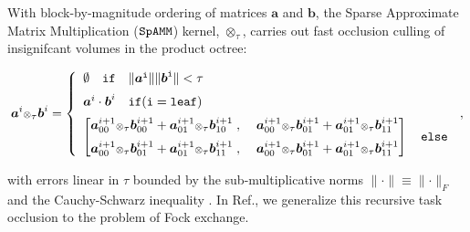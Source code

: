 \documentclass[letterpaper,twocolumn,amsmath,amsfont,amssymb,english,aps,jcp,preprintnumbers,groupaddress,nofootinbib,tightenlines]{revtex4}
\newcommand{\mat}[1]{\boldsymbol{#1}}
\newcommand{\ot}{ {\scriptstyle \otimes}_{ \tau } }
\begin{document}
With block-by-magnitude ordering of matrices $\mat{a}$ and $\mat{b}$, 
the Sparse Approximate Matrix Multiplication ($\tt SpAMM$) kernel,  $\ot$, carries out fast 
occlusion culling of insignifcant volumes in the product octree:
\begin{widetext}
\begin{equation}
\mat{a}^{i} \ot \mat{b}^{i} = 
\left\{
        \begin{array}{ll}
                 \emptyset \quad \tt{if}\quad \lVert \mat{a}^i \rVert \lVert \mat{b}^i \rVert < \tau \\[0.2cm]
                 \mat{a} ^i \cdot \mat{b}^i \quad  \tt{if}(i=\tt{leaf}) \\[0.2cm]
\begin{bmatrix} \mat{a}^{i+1}_{00} \ot \mat{b}^{i+1}_{00} +\mat{a}^{i+1}_{01} \ot \mat{b}^{i+1}_{10} \; , \; &
                \mat{a}^{i+1}_{00} \ot \mat{b}^{i+1}_{01} +\mat{a}^{i+1}_{01} \ot \mat{b}^{i+1}_{11}  \\[0.2cm] 
                \mat{a}^{i+1}_{00} \ot \mat{b}^{i+1}_{01} +\mat{a}^{i+1}_{01} \ot \mat{b}^{i+1}_{11} \; , \; & 
                \mat{a}^{i+1}_{00} \ot \mat{b}^{i+1}_{01} +\mat{a}^{i+1}_{01} \ot \mat{b}^{i+1}_{11}   
\end{bmatrix}  \quad \tt{else}
                \end{array}
              \right.  \, ,
\end{equation}
\end{widetext}
with errors linear in $\tau$ 
bounded by the sub-multiplicative norms $\lVert \cdot \rVert \equiv \lVert \cdot \rVert_F$ and the Cauchy-Schwarz inequality \cite{kahan,}.
In Ref.\cite{Challacombe2014}, we generalize this recursive task occlusion to the problem of Fock exchange.
\end{document}
